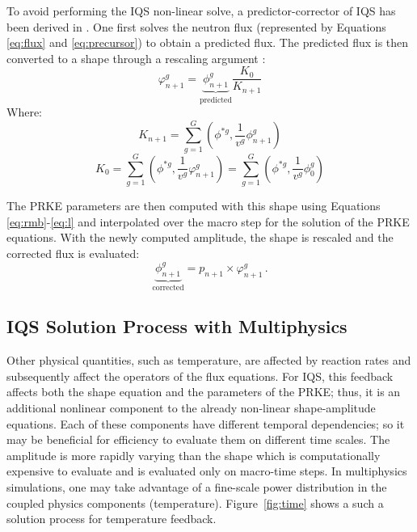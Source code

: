 \documentclass{anstrans}
\newcommand{\be}{\begin{equation}}
\newcommand{\ee}{\end{equation}}
\begin{document}
To avoid performing the IQS non-linear solve, a predictor-corrector of IQS has been derived in \cite{Dulla2008}. 
One first solves the neutron flux (represented by Equations \ref{eq:flux} and \ref{eq:precursor}) to obtain a predicted flux.  
The predicted flux is then converted to a shape through a rescaling argument :
\be
\varphi^g_{n+1} = \underbrace{\phi^g_{n+1}}_{\text{predicted}} \frac{K_0}{K_{n+1}}
\label{eq:rescale}
\ee
Where:
\be
K_{n+1} =\sum_{g=1}^G\left(\phi^{*g},\frac{1}{v^g}\phi^g_{n+1}\right)
\ee
\be
K_{0} =\sum_{g=1}^G\left(\phi^{*g},\frac{1}{v^g}\varphi^g_{n+1}\right)=\sum_{g=1}^G\left(\phi^{*g},\frac{1}{v^g}\phi^g_{0}\right)
\ee

The PRKE parameters are then computed with this shape using Equations \eqref{eq:rmb}-\eqref{eq:l} and interpolated over the macro step
for the solution of the PRKE equations.  With the newly computed amplitude, the shape is rescaled and the corrected flux is evaluated:
\be
\underbrace{\phi^g_{n+1}}_{\text{corrected}} = p_{n+1} \times \varphi^g_{n+1} \,.
\ee

\subsection{IQS Solution Process with Multiphysics}

Other physical quantities, such as temperature, are affected by reaction rates and subsequently affect the operators of the flux equations.  
For IQS, this feedback affects both the shape equation and the parameters of the PRKE; thus, it is an additional nonlinear component to the 
already non-linear shape-amplitude equations.  Each of these components have different temporal dependencies; so it may be beneficial for 
efficiency to evaluate them on different time scales.  The amplitude is more rapidly varying than the shape which is computationally expensive to evaluate
and is evaluated only on macro-time steps. In multiphysics simulations, one may take advantage of a fine-scale power distribution in the coupled
physics components (temperature). Figure~\ref{fig:time} shows a such a solution process for temperature feedback.
\end{document}
